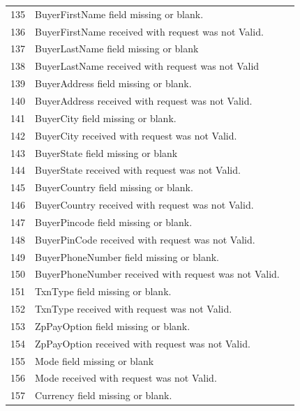 \documentclass{article}
\newcommand{\xmark}{\ding{55}}
\begin{document}
\begin{longtable}{||c|p{12.5cm}||c|}
135 &BuyerFirstName field missing or blank.& \textcolor{red} {\xmark} \\
136 &BuyerFirstName received with request was not Valid.& \textcolor{red} {\xmark} \\
137 &BuyerLastName field missing or blank& \textcolor{red} {\xmark} \\
138 &BuyerLastName received with request was not Valid& \textcolor{red} {\xmark} \\
139 &BuyerAddress field missing or blank.& \textcolor{red} {\xmark} \\
140 &BuyerAddress received with request was not Valid.& \textcolor{red} {\xmark} \\
141 &BuyerCity field missing or blank.& \textcolor{red} {\xmark} \\
142 &BuyerCity received with request was not Valid.& \textcolor{red} {\xmark} \\
143 &BuyerState field missing or blank& \textcolor{red} {\xmark} \\
144 &BuyerState received with request was not Valid.& \textcolor{red} {\xmark} \\
145 &BuyerCountry field missing or blank.& \textcolor{red} {\xmark} \\
146 &BuyerCountry received with request was not Valid.& \textcolor{red} {\xmark} \\
147 &BuyerPincode field missing or blank.& \textcolor{red} {\xmark} \\
148 &BuyerPinCode received with request was not Valid.& \textcolor{red} {\xmark} \\
149 &BuyerPhoneNumber field missing or blank.& \textcolor{red} {\xmark} \\
150 &BuyerPhoneNumber received with request was not Valid.& \textcolor{red} {\xmark} \\
151 &TxnType field missing or blank.& \textcolor{red} {\xmark} \\
152 &TxnType received with request was not Valid.& \textcolor{red} {\xmark} \\
153 &ZpPayOption field missing or blank.& \textcolor{red} {\xmark} \\
154 &ZpPayOption received with request was not Valid.& \textcolor{red} {\xmark} \\
155 &Mode field missing or blank& \textcolor{red} {\xmark} \\
156 &Mode received with request was not Valid.& \textcolor{red} {\xmark} \\
157 &Currency field missing or blank.& \textcolor{red} {\xmark} \\

\end{longtable}
\end{document}
